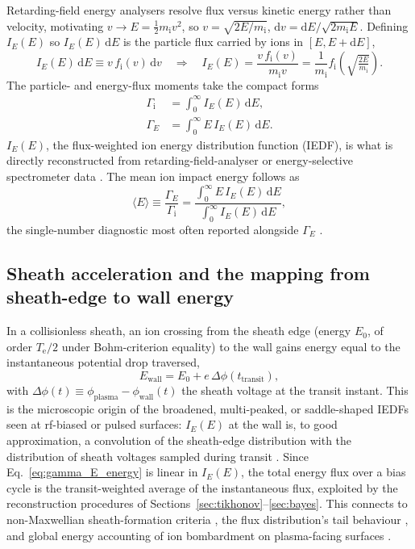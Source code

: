 Retarding-field energy analysers resolve flux versus kinetic energy rather than velocity, motivating $v \to E = \tfrac{1}{2}m_{\mathrm{i}}v^{2}$, so $v = \sqrt{2E/m_{\mathrm{i}}}$, $\mathrm{d}v = \mathrm{d}E/\sqrt{2m_{\mathrm{i}}E}$. Defining $I_{E}(E)$ so $I_{E}(E)\,\mathrm{d}E$ is the particle flux carried by ions in $[E, E+\mathrm{d}E]$,
\begin{equation}
I_{E}(E)\,\mathrm{d}E \equiv v\,f_{\mathrm{i}}(v)\,\mathrm{d}v
\quad\Longrightarrow\quad
I_{E}(E) = \frac{v\,f_{\mathrm{i}}(v)}{m_{\mathrm{i}}v} = \frac{1}{m_{\mathrm{i}}}f_{\mathrm{i}}\!\left(\sqrt{\tfrac{2E}{m_{\mathrm{i}}}}\right).
\label{eq:iedf_def}
\end{equation}
The particle- and energy-flux moments take the compact forms
\begin{align}
\Gamma_{\mathrm{i}} &= \int_{0}^{\infty} I_{E}(E)\,\mathrm{d}E, \label{eq:gamma_i_energy} \\
\Gamma_{E} &= \int_{0}^{\infty} E\,I_{E}(E)\,\mathrm{d}E. \label{eq:gamma_E_energy}
\end{align}
$I_{E}(E)$, the flux-weighted ion energy distribution function (IEDF), is what is directly reconstructed from retarding-field-analyser or energy-selective spectrometer data \cite{ref0074,ref0090,ref0672}. The mean ion impact energy follows as
\begin{equation}
\langle E \rangle \equiv \frac{\Gamma_{E}}{\Gamma_{\mathrm{i}}} = \frac{\int_{0}^{\infty} E\,I_{E}(E)\,\mathrm{d}E}{\int_{0}^{\infty} I_{E}(E)\,\mathrm{d}E},
\label{eq:mean_energy}
\end{equation}
the single-number diagnostic most often reported alongside $\Gamma_{E}$ \cite{ref0075}.

\subsection{Sheath acceleration and the mapping from sheath-edge to wall energy}

In a collisionless sheath, an ion crossing from the sheath edge (energy $E_{0}$, of order $T_{\mathrm{e}}/2$ under Bohm-criterion equality) to the wall gains energy equal to the instantaneous potential drop traversed,
\begin{equation}
E_{\mathrm{wall}} = E_{0} + e\,\Delta\phi(t_{\mathrm{transit}}),
\label{eq:energy_gain}
\end{equation}
with $\Delta\phi(t) \equiv \phi_{\mathrm{plasma}} - \phi_{\mathrm{wall}}(t)$ the sheath voltage at the transit instant. This is the microscopic origin of the broadened, multi-peaked, or saddle-shaped IEDFs seen at rf-biased or pulsed surfaces: $I_{E}(E)$ at the wall is, to good approximation, a convolution of the sheath-edge distribution with the distribution of sheath voltages sampled during transit \cite{ref0090,ref0672}. Since Eq.~\eqref{eq:gamma_E_energy} is linear in $I_{E}(E)$, the total energy flux over a bias cycle is the transit-weighted average of the instantaneous flux, exploited by the reconstruction procedures of Sections~\ref{sec:tikhonov}--\ref{sec:bayes}. This connects to non-Maxwellian sheath-formation criteria \cite{ref0090}, the flux distribution's tail behaviour \cite{ref0096}, and global energy accounting of ion bombardment on plasma-facing surfaces \cite{ref0093}.

